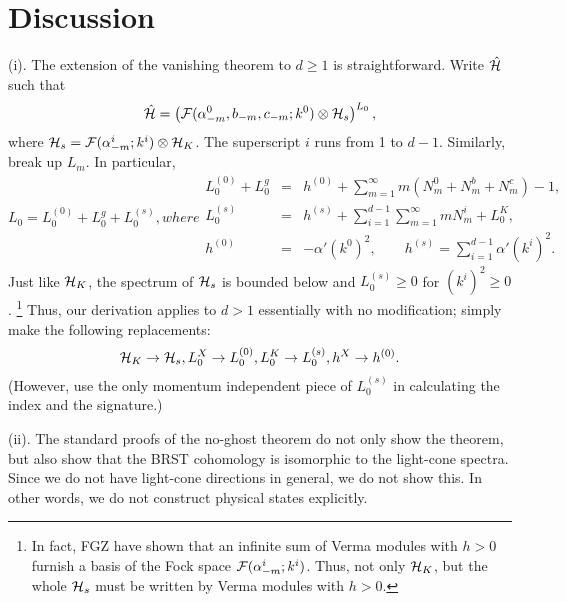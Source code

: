 \documentclass[a4paper,12pt]{article}
\begin{document}
\section{Discussion}\label{sec:discussion}

(i). The extension of the vanishing theorem to $d \geq 1$ is straightforward. 
Write $ \hat{\cal H} $ such that
\begin{equation}
%
\hat{\cal H}=
\left(
{\cal F}(\alpha^{0}_{-m}, b_{-m}, c_{-m};k^0) \otimes {\cal H}_{s}
\right)^{L_0},
%
\end{equation}
where
$ {\cal H}_{s} = {\cal F}(\alpha^{i}_{-m};k^i) \otimes {\cal H}_{K} $. The
superscript $i$ runs from 1 to $d \! - \! 1$. Similarly, break up $ L_{m} $. In particular,
\begin{subequations}
\begin{equation}
%
L_{0}=L^{(0)}_{0}+L^{g}_{0}+L^{(s)}_{0},
%
\end{equation}
where
\begin{eqnarray}
%
L^{(0)}_{0}+L^{g}_{0}
	&=& h^{(0)}
	+ \sum_{m=1}^{\infty} m ( N_{m}^{0}+N_{m}^{b}+N_{m}^{c}  ) - 1,
	\\
L^{(s)}_{0} &=& h^{(s)} 
	+ \sum_{i=1}^{d-1} \sum_{m=1}^{\infty} m N_{m}^{i} + L_{0}^{K},
	\\
h^{(0)} &=& -\alpha' (k^0)^2, \qquad
h^{(s)} = \sum_{i=1}^{d-1} \alpha' (k^i)^2.
\end{eqnarray}
\end{subequations}
Just like ${\cal H}_{K}$, the spectrum of ${\cal H}_{s}$ is bounded below and $L_{0}^{(s)} \geq 0$ for $(k^i)^2 \geq 0$.%
\footnote{In fact, FGZ have shown that an infinite sum of Verma modules with $h>0$ furnish a basis of the Fock space ${\cal F}(\alpha^{i}_{-m};k^i)$. Thus, not only ${\cal H}_{K}$, but the whole ${\cal H}_{s}$ must be written by Verma modules with $h>0$.}
Thus, our derivation applies to $d>1$ essentially with no modification; simply make the following replacements:
\begin{equation}
%
{\cal H}_{K} \rightarrow {\cal H}_{s},
L_{0}^{X} \rightarrow L_{0}^{(0)}, 
L_{0}^{K} \rightarrow L_{0}^{(s)},
h^{X} \rightarrow h^{(0)}.
%
\end{equation}
(However, use the only momentum independent piece of $L_{0}^{(s)}$ in calculating the index and the signature.)

(ii). The standard proofs of the no-ghost theorem 
do not only show the theorem, but also show
that the BRST cohomology is isomorphic to the
light-cone spectra. 
Since we do not have light-cone directions in general, we do not show this. In other words, we do not construct physical
states explicitly.
\end{document}
